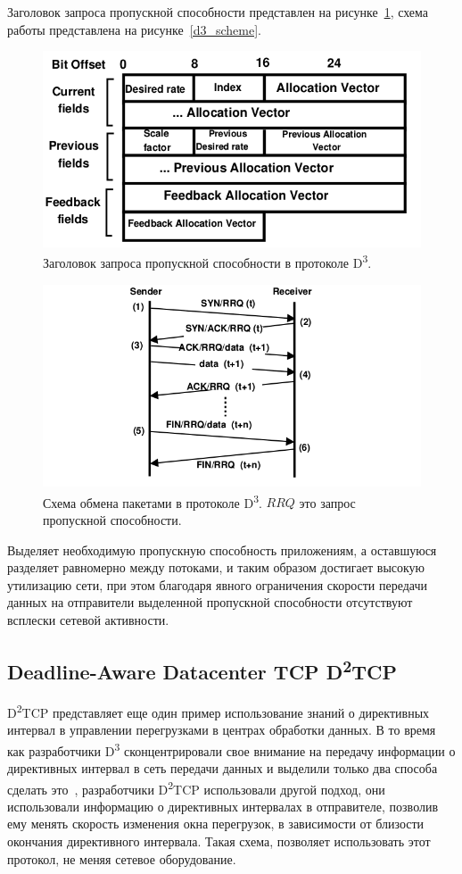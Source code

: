 \documentclass[14pt, a4paper,oneside]{extarticle}
\begin{document}
Заголовок запроса пропускной способности представлен на рисунке~\ref{header}, схема работы представлена на рисунке~\ref{d3_scheme}.
\begin{figure}
\includegraphics[width=0.7\linewidth]{header}
\caption{Заголовок запроса пропускной способности в протоколе D\textsuperscript{3}.}
\label{header}
\end{figure}
\begin{figure}
\includegraphics[width=\linewidth]{d3_sheme}
\caption{Схема обмена пакетами в протоколе D\textsuperscript{3}. $RRQ$ это запрос пропускной способности.}
\label{d3_sheme}
\end{figure}

Выделяет необходимую пропускную способность приложениям, а оставшуюся разделяет равномерно между потоками, и таким образом достигает высокую утилизацию сети, при этом благодаря явного ограничения скорости передачи данных на отправители выделенной пропускной способности  отсутствуют всплески сетевой активности.

\subsection{Deadline-Aware Datacenter TCP D\textsuperscript{2}TCP}

D\textsuperscript{2}TCP представляет еще один пример использование знаний о директивных интервал в управлении перегрузками в центрах обработки данных. В то время как разработчики D\textsuperscript{3} сконцентрировали свое внимание на передачу информации о директивных интервал в сеть передачи данных и выделили только два способа сделать это~\cite{d3tcp}, разработчики D\textsuperscript{2}TCP использовали другой подход, они использовали информацию о директивных интервалах в отправителе, позволив ему менять скорость изменения окна перегрузок, в зависимости от близости окончания директивного интервала. Такая схема, позволяет использовать этот протокол, не меняя сетевое оборудование.
\end{document}
